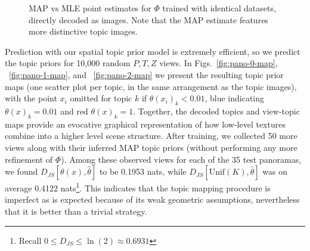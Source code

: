 \begin{figure}
    \centering
    \caption{MAP \protect{} vs MLE \protect{} point estimates for $\Phi$ trained with identical datasets, directly decoded as images. Note that the MAP estimate features more distinctive topic images.}

\end{figure}

Prediction with our spatial topic prior model is extremely efficient, so we predict the topic priors for 10,000 random $P,T,Z$ views. In Figs.~\ref{fig:pano-0-map}, ~\ref{fig:pano-1-map}, and ~\ref{fig:pano-2-map} we present the resulting topic prior maps (one scatter plot per topic, in the same arrangement as the topic images), with the point $x_i$ omitted for topic $k$ if $\theta(x_i)_k < 0.01$, blue indicating $\theta(x)_k = 0.01$ and red $\theta(x)_k = 1$. Together, the decoded topics and view-topic maps provide an evocative graphical representation of how low-level textures combine into a higher level scene structure. After training, we collected 50 more views along with their inferred MAP topic priors (without performing any more refinement of $\Phi$). Among these observed views for each of the 35 test panoramas, we found $D_{JS}[\theta(x), \hat{\theta}]$ to be 0.1953 nats, while $D_{JS}[\mathrm{Unif}(K), \hat{\theta}]$ was on average 0.4122 nats\footnote{Recall $0 \leq D_{JS} \leq \ln(2) \approx 0.6931$}. This indicates that the topic mapping procedure is imperfect as is expected because of its weak geometric assumptions, nevertheless that it is better than a trivial strategy.


